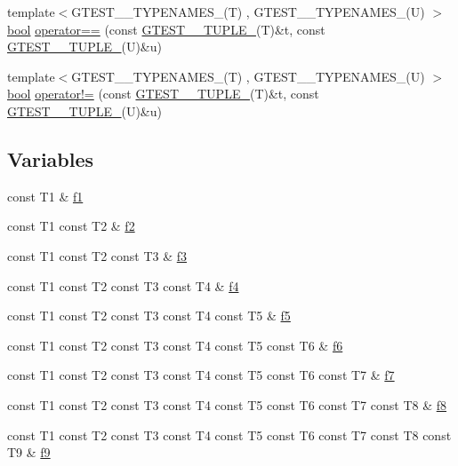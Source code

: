 \begin{DoxyCompactItemize}
\item 
{\footnotesize template$<$G\+T\+E\+S\+T\+\_\+\_\+\+T\+Y\+P\+E\+N\+A\+M\+E\+S\+\_\+(\+T) , G\+T\+E\+S\+T\+\_\+\_\+\+T\+Y\+P\+E\+N\+A\+M\+E\+S\+\_\+(\+U) $>$ }\\\hyperlink{classbool}{bool} \hyperlink{namespacestd_1_1tr1_af4516de784404381f9b14797694b6311}{operator==} (const \hyperlink{namespacestd_1_1tr1_aa636d3269bf1f368a7bc09ff158bc482}{G\+T\+E\+S\+T\+\_\+\_\+\+T\+U\+P\+L\+E\+\_\+}(T)\&t, const \hyperlink{namespacestd_1_1tr1_aa636d3269bf1f368a7bc09ff158bc482}{G\+T\+E\+S\+T\+\_\+\_\+\+T\+U\+P\+L\+E\+\_\+}(U)\&u)
\item 
{\footnotesize template$<$G\+T\+E\+S\+T\+\_\+\_\+\+T\+Y\+P\+E\+N\+A\+M\+E\+S\+\_\+(\+T) , G\+T\+E\+S\+T\+\_\+\_\+\+T\+Y\+P\+E\+N\+A\+M\+E\+S\+\_\+(\+U) $>$ }\\\hyperlink{classbool}{bool} \hyperlink{namespacestd_1_1tr1_a058882c51de469b5e78d29076f864940}{operator!=} (const \hyperlink{namespacestd_1_1tr1_aa636d3269bf1f368a7bc09ff158bc482}{G\+T\+E\+S\+T\+\_\+\_\+\+T\+U\+P\+L\+E\+\_\+}(T)\&t, const \hyperlink{namespacestd_1_1tr1_aa636d3269bf1f368a7bc09ff158bc482}{G\+T\+E\+S\+T\+\_\+\_\+\+T\+U\+P\+L\+E\+\_\+}(U)\&u)
\end{DoxyCompactItemize}
\subsection*{Variables}
\begin{DoxyCompactItemize}
\item 
const T1 \& \hyperlink{namespacestd_1_1tr1_a9c0fa65b105f8e2f58ba59ecf75fd000}{f1}
\item 
const T1 const T2 \& \hyperlink{namespacestd_1_1tr1_a87dd9e009868361317f587126dba63d4}{f2}
\item 
const T1 const T2 const T3 \& \hyperlink{namespacestd_1_1tr1_a0f7c3b47d27d42d82d1a333ea420ce4e}{f3}
\item 
const T1 const T2 const T3 const T4 \& \hyperlink{namespacestd_1_1tr1_adc796e02b7385d526aff708189564f67}{f4}
\item 
const T1 const T2 const T3 const T4 const T5 \& \hyperlink{namespacestd_1_1tr1_a9c1eb66b2b2fa321942af95405232a0d}{f5}
\item 
const T1 const T2 const T3 const T4 const T5 const T6 \& \hyperlink{namespacestd_1_1tr1_a6b62f32e1e3e21bceb94eb46c4cbfd56}{f6}
\item 
const T1 const T2 const T3 const T4 const T5 const T6 const T7 \& \hyperlink{namespacestd_1_1tr1_a2185f3a1c07f2df072c39cb91ffa89a4}{f7}
\item 
const T1 const T2 const T3 const T4 const T5 const T6 const T7 const T8 \& \hyperlink{namespacestd_1_1tr1_ab998afa41cea8d6d26d7e4288b0bf974}{f8}
\item 
const T1 const T2 const T3 const T4 const T5 const T6 const T7 const T8 const T9 \& \hyperlink{namespacestd_1_1tr1_a216d2c7cdfaaf415caba2f88e2c34413}{f9}
\end{DoxyCompactItemize}



